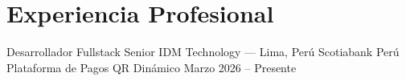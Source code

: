 
\section{Experiencia Profesional}

\cvEntryClient%
  {Desarrollador Fullstack Senior}%
  {IDM Technology --- Lima, Perú}%
  {Scotiabank Perú}%
  {Plataforma de Pagos QR Dinámico}%
  {Marzo 2026 -- Presente}

